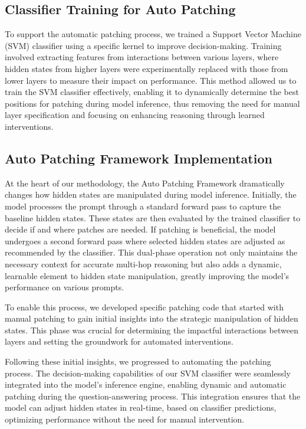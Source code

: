 \documentclass[11pt]{article}
\begin{document}
\subsection{Classifier Training for Auto Patching}
To support the automatic patching process, we trained a Support Vector Machine (SVM) classifier using a specific kernel to improve decision-making. Training involved extracting features from interactions between various layers, where hidden states from higher layers were experimentally replaced with those from lower layers to measure their impact on performance. This method allowed us to train the SVM classifier effectively, enabling it to dynamically determine the best positions for patching during model inference, thus removing the need for manual layer specification and focusing on enhancing reasoning through learned interventions.

\subsection{Auto Patching Framework Implementation}
At the heart of our methodology, the Auto Patching Framework dramatically changes how hidden states are manipulated during model inference. Initially, the model processes the prompt through a standard forward pass to capture the baseline hidden states. These states are then evaluated by the trained classifier to decide if and where patches are needed. If patching is beneficial, the model undergoes a second forward pass where selected hidden states are adjusted as recommended by the classifier. This dual-phase operation not only maintains the necessary context for accurate multi-hop reasoning but also adds a dynamic, learnable element to hidden state manipulation, greatly improving the model's performance on various prompts.

To enable this process, we developed specific patching code that started with manual patching to gain initial insights into the strategic manipulation of hidden states. This phase was crucial for determining the impactful interactions between layers and setting the groundwork for automated interventions.

Following these initial insights, we progressed to automating the patching process. The decision-making capabilities of our SVM classifier were seamlessly integrated into the model’s inference engine, enabling dynamic and automatic patching during the question-answering process. This integration ensures that the model can adjust hidden states in real-time, based on classifier predictions, optimizing performance without the need for manual intervention.
\end{document}
